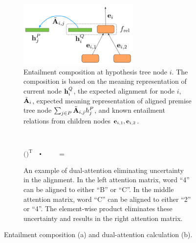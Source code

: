 \begin{figure}
\centering
\begin{subfigure}[b]{0.49\textwidth}
\centering
\includegraphics[width=0.65\textwidth]{entailmentlstm}
\caption{Entailment composition at hypothesis tree node $i$.
The composition is based on the meaning representation
of current node $\mathbf{h}_i^Q$, 
the expected alignment for node $i$, $\tilde{\mathbf{A}}_i$,
expected meaning representation of aligned premise
tree node $\sum_{j\in P}\tilde{\mathbf{A}}_{i,j} h_j^P$, 
and known entailment relations from children nodes 
$\mathbf{e}_{i, 1}, \mathbf{e}_{i,2}$.
\label{fig:entnode}
}
\end{subfigure} 
$\ $
\begin{subfigure}[b]{0.49\textwidth}
\begin{center}
$\Bigg($$\Bigg)^{\text{T}}\quad\mathbf{\centerdot}\quad$
$\quad=\quad$
\end{center}
\caption{An example of dual-attention eliminating
uncertainty in the alignment.
In the left attention matrix, word ``4'' can be aligned to
either ``B'' or ``C''. In the middle attention matrix,
word ``C'' can be aligned to either ``2'' or ``4''.
The element-wise product eliminates these uncertainty 
and results in the right attention matrix.
\label{fig:dualatt}
}
\end{subfigure}
\vspace{-0.4cm}
\caption{Entailment composition (a) and dual-attention calculation (b).}
\vspace{-0.5cm}
\end{figure}

